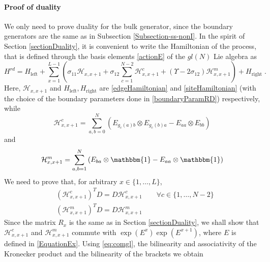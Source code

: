 \documentclass[10pt]{article}
\numberwithin{equation}{section}
\numberwithin{equation}{subsection}
\newcommand{\dt}{\;.}
\begin{document}
\paragraph{Proof of duality}
We only need to prove duality for the bulk generator, since the boundary generators are the same as in Subsection \ref{Subsection-ss-nonI}. 
In the spirit of Section \ref{sectionDuality}, it is convenient to write the Hamiltonian of the process, that is defined through the basis elements \eqref{actionE} of the $gl(N)$ Lie algebra as 
\begin{equation}
	H^{rd}=H_{\text{left}}+\sum_{x=1}^{L-1}\left(\sigma_{11}\mathcal{H}_{x,x+1}+\sigma_{12}\sum_{c=1}^{N-2}\mathcal{H}_{x,x+1}^{c}+(\Upsilon-2\sigma_{12})\mathcal{H}_{x,x+1}^{m}\right)+H_{\text{right}}\dt
\end{equation}
Here, $\mathcal{H}_{x,x+1}$ and $H_{\text{left}},H_{\text{right}}$ are \eqref{edgeHamiltonian}  and \eqref{siteHamiltonian} (with the choice of the boundary parameters done in \eqref{boundaryParamRD}) respectively, while
\begin{equation}
	\mathcal{H}_{x,x+1}^{c}=\sum_{a,b=0}^{N}\left(E_{g_{c}(a)b}\otimes E_{g_{c}(b)a}-E_{aa}\otimes E_{bb}\right)
\end{equation}
and 
\begin{equation}
	\mathcal{H}_{x,x+1}^{m}=\sum_{a,b=1}^{N}\left(E_{ba}\otimes \mathbbm{1}-E_{aa}\otimes \mathbbm{1}\right)
\end{equation}
We need to prove that, for arbitrary $x\in\{1,\ldots,L\}$,
\begin{align}
	&(\mathcal{H}_{x,x+1}^{c})^{T}D=D\mathcal{H}_{x,x+1}^{c}\qquad \forall c\in \{1,\ldots,N-2\}\label{cDualityRelation}\\
	&(\mathcal{H}_{x,x+1}^{m})^{T}D=D\mathcal{H}_{x,x+1}^{m}\label{mDualityRelation}
\end{align}
Since the matrix $R_{x}$ is the same as in Section \ref{sectionDuality}, we shall show that $\mathcal{H}_{x,x+1}^{c}$ and $\mathcal{H}_{x,x+1}^{m}$ commute with $\exp{(E^{x})}\exp{(E^{x+1})}$, where $E$ is defined in \eqref{EquationEx}. Using \eqref{eq:comgl}, the bilinearity and associativity of the Kronecker product and the bilinearity of the brackets we obtain 
\end{document}
